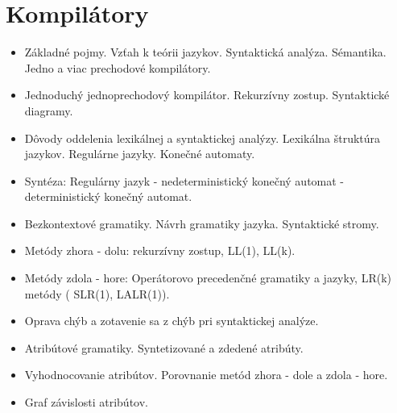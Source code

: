 \documentclass[a4paper]{report}
\begin{document}
\chapter{Kompilátory}

\begin{zadanie}
\begin{itemize}
 \item Základné pojmy. Vzťah k teórii jazykov. Syntaktická analýza. Sémantika. Jedno a viac prechodové kompilátory.
 \item Jednoduchý jednoprechodový kompilátor. Rekurzívny zostup. Syntaktické diagramy.
\end{itemize}
\end{zadanie}

\begin{zadanie}
\begin{itemize}
 \item Dôvody oddelenia lexikálnej a syntaktickej analýzy. Lexikálna štruktúra jazykov. Regulárne jazyky. Konečné automaty.
 \item Syntéza: Regulárny jazyk - nedeterministický konečný automat - deterministický konečný automat.
\end{itemize}
\end{zadanie}

\begin{zadanie}
\begin{itemize}
 \item Bezkontextové gramatiky. Návrh gramatiky jazyka. Syntaktické stromy.
 \item Metódy zhora - dolu: rekurzívny zostup, LL(1), LL(k).
 \item Metódy zdola - hore: Operátorovo precedenčné gramatiky a jazyky, LR(k) metódy ( SLR(1), LALR(1)).
 \item Oprava chýb a zotavenie sa z chýb pri syntaktickej analýze.
\end{itemize}
\end{zadanie}

\begin{zadanie}
\begin{itemize}
 \item Atribútové gramatiky. Syntetizované a zdedené atribúty.
 \item Vyhodnocovanie atribútov. Porovnanie metód zhora - dole a zdola - hore.
 \item Graf závislosti atribútov.
\end{itemize}
\end{zadanie}
\end{document}
